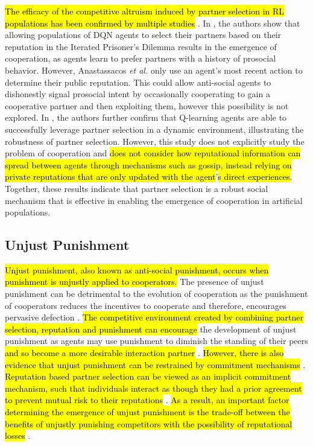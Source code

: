 \documentclass[sn-aps,numbered]{sn-jnl}%
\theoremstyle{thmstyleone}%
\theoremstyle{thmstyletwo}%
\theoremstyle{thmstylethree}%
\begin{document}
\hl{The efficacy of the competitive altruism induced by partner selection in RL populations has been confirmed by multiple studies} \citep{mirco_partner_selection, sen2007learning}. In \citep{mirco_partner_selection}, the authors show that allowing populations of DQN agents to select their partners based on their reputation in the Iterated Prisoner's Dilemma results in the emergence of cooperation, as agents learn to prefer partners with a history of prosocial behavior. However, Anastassacos \textit{et al.} only use an agent's most recent action to determine their public reputation. This could allow anti-social agents to dishonestly signal prosocial intent by occasionally cooperating to gain a cooperative partner and then exploiting them, however this possibility is not explored. In \cite{sen2007learning}, the authors further confirm that Q-learning agents are able to successfully leverage partner selection in a dynamic environment, illustrating the robustness of partner selection. However, this study does not explicitly study the problem of cooperation and \hl{does not consider how reputational information can spread between agents through mechanisms such as gossip, instead relying on private reputations that are only updated with the agent}’\hl{s direct experiences}. Together, these results indicate that partner selection is a robust social mechanism that is effective in enabling the emergence of cooperation in artificial populations.

\subsection{Unjust Punishment} 

\hl{Unjust punishment, also known as anti-social punishment, occurs when punishment is unjustly applied to cooperators.} The presence of unjust punishment can be detrimental to the evolution of cooperation as the punishment of cooperators reduces the incentives to cooperate and therefore, encourages pervasive defection \citep{punishment_counter_punishment_nikiforakis, Pleasant2018, Herrmann2008, Rand2010}. \hl{The competitive environment created by combining partner selection, reputation and punishment can encourage} the development of unjust punishment as agents may use punishment to diminish the standing of their peers \hl{and so become a more desirable interaction partner} \citep{Pleasant2018}. \hl{However, there is also evidence that unjust punishment can be restrained by commitment mechanisms} \citep{punishment_coop_commitment, synergy_intention_commitment}. \hl{Reputation based partner selection can be viewed as an implicit commitment mechanism, such that individuals interact as though they had a prior agreement to prevent mutual risk to their reputations} \citep{punishment_coop_commitment, synergy_intention_commitment, krellner2023words}. \hl{As a result, an important factor determining the emergence of unjust punishment is the trade-off between the benefits of unjustly punishing competitors with the possibility of reputational losses} \citep{Pleasant2018, Raihani2015_tpp_rewarded_helpers}.
\end{document}
